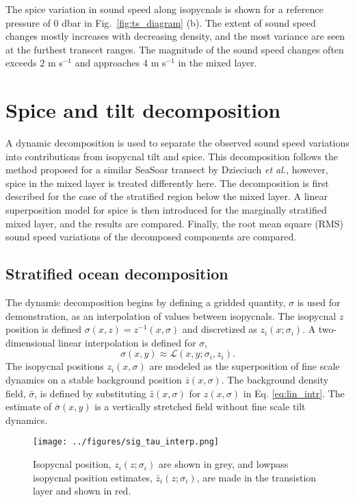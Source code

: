 \documentclass[preprint,NumberedRefs]{JASA}
\begin{document}
The spice variation in sound speed along isopycnals is shown for a reference pressure of 0 dbar in Fig.~\ref{fig:ts_diagram} (b). The extent of sound speed changes mostly increases with decreasing density, and the most variance are seen at the furthest transcet ranges. The magnitude of the sound speed changes often exceeds 2 m s$^{-1}$ and approaches 4 m s$^{-1}$ in the mixed layer.

\section{\label{sec:decomposition}Spice and tilt decomposition}
A dynamic decomposition is used to separate the observed sound speed variations into contributions from isopycnal tilt and spice. This decomposition follows the method proposed for a similar SeaSoar transect by Dzieciuch \emph{et al.},\citep{dzieciuch2004} however, spice in the mixed layer is treated differently here. The decomposition is first described for the case of the stratified region below the mixed layer. A linear superposition model for spice is then introduced for the marginally stratified mixed layer, and the results are compared. Finally, the root mean square (RMS) sound speed variations of the decomposed components are compared.

\subsection{Stratified ocean decomposition}
The dynamic decomposition begins by defining a gridded quantity, $\sigma$ is used for demonstration, as an interpolation of values between isopycnals. The isopycnal $z$ position is defined $\sigma(x, z) = z^{-1}(x, \sigma)$ and discretized as $z_i(x; \sigma_i)$. A two-dimensional linear interpolation is defined for $\sigma$,
\begin{equation}
    \sigma(x,y)\approx\mathcal{L}(x, y; \sigma_i, z_i).
    \label{eq:lin_intr}
\end{equation}
The isopycnal positions $z_i(x, \sigma)$ are modeled as the superposition of fine scale dynamics on a stable background position $\bar{z}(x, \sigma)$. The background density field, $\bar{\sigma}$, is defined by substituting $\bar{z}(x, \sigma)$ for $z(x, \sigma)$ in Eq. \eqref{eq:lin_intr}. The estimate of $\bar{\sigma}(x,y)$ is a vertically stretched field without fine scale tilt dynamics.

\begin{figure}
\texttt{[image: ../figures/sig\_tau\_interp.png]}
    \caption{\label{fig:cntrs}{Isopycnal position, $z_i(z; \sigma_i)$ are shown in grey, and lowpass isopycnal position estimates, $\bar{z}_i(z; \sigma_i)$, are made in the transistion layer and shown in red.}}
\end{figure}
\end{document}
